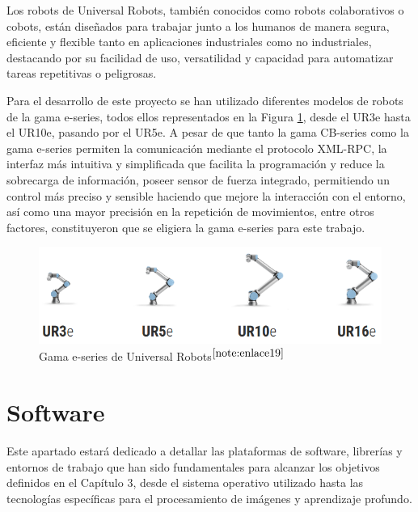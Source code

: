 Los robots de Universal Robots, también conocidos como robots colaborativos o cobots, están diseñados para trabajar junto a los humanos de manera segura, eficiente y flexible tanto en aplicaciones industriales como no industriales, destacando por su facilidad de uso, versatilidad y capacidad para automatizar tareas repetitivas o peligrosas. 

Para el desarrollo de este proyecto se han utilizado diferentes modelos de robots de la gama e-series, todos ellos representados en la Figura \ref{fig:Gama_e-series}, desde el UR3e hasta el UR10e, pasando por el UR5e.
A pesar de que tanto la gama CB-series como la gama e-series permiten la comunicación mediante el protocolo XML-RPC, la interfaz más intuitiva y simplificada que facilita la programación y reduce la sobrecarga de información, poseer sensor de fuerza integrado, permitiendo un control más preciso y sensible haciendo que mejore la interacción con el entorno, así como una mayor precisión en la repetición de movimientos, entre otros factores, constituyeron que se eligiera la gama e-series para este trabajo.

\begin{figure} [H]
    \begin{center}
      \includegraphics[width=15cm]{figs/Gama e-series.png}
    \end{center}
    \caption{Gama e-series de Universal Robots$^{\ref{note:enlace19}}$}
    \label{fig:Gama_e-series}
\end{figure}

\setcounter{footnote}{19} 


\section{Software}
\label{sec:software}

Este apartado estará dedicado a detallar las plataformas de software, librerías y entornos de trabajo que han sido fundamentales para alcanzar los objetivos definidos en el Capítulo 3, desde el sistema operativo utilizado hasta las tecnologías específicas para el procesamiento de imágenes y aprendizaje profundo.


